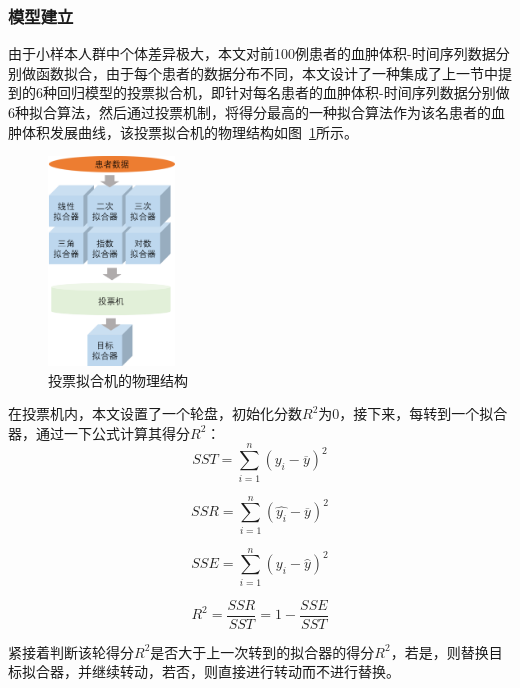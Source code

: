 \documentclass[bwprint]{gmcmthesis}
\begin{document}
\subsubsection{模型建立}\label{6种回归的章节}
由于小样本人群中个体差异极大，本文对前100例患者的血肿体积-时间序列数据分别做函数拟合，由于每个患者的数据分布不同，本文设计了一种集成了上一节中提到的6种回归模型的投票拟合机，即针对每名患者的血肿体积-时间序列数据分别做6种拟合算法，然后通过投票机制，将得分最高的一种拟合算法作为该名患者的血肿体积发展曲线，该投票拟合机的物理结构如图~\ref{投票拟合机的物理结构}所示。

\begin{figure}[!h]
\centering
\includegraphics[width=0.3\textwidth]{fig_me/1a概念图.png}
\caption{投票拟合机的物理结构}
\label{投票拟合机的物理结构}
\end{figure}

在投票机内，本文设置了一个轮盘，初始化分数$R^2$为0，接下来，每转到一个拟合器，通过一下公式计算其得分$R^2$：
\begin{equation}
SST=\sum\limits_{i=1}^{n}(y_i-\overline{y})^2
\end{equation}

\begin{equation}
SSR=\sum\limits_{i=1}^{n}(\hat{y_i}-\overline{y})^2
\end{equation}

\begin{equation}
SSE=\sum\limits_{i=1}^{n}(y_i-\hat{y})^2
\end{equation}

\begin{equation}
R^2=\frac{SSR}{SST}=1-\frac{SSE}{SST}
\end{equation}

紧接着判断该轮得分$R^2$是否大于上一次转到的拟合器的得分$R^2$，若是，则替换目标拟合器，并继续转动，若否，则直接进行转动而不进行替换。
\end{document}
